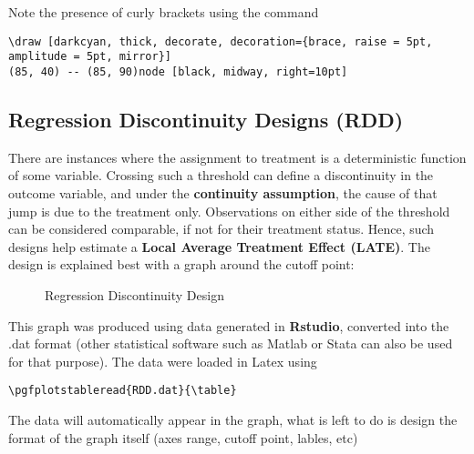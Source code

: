 \documentclass[english]{article}
\begin{document}
Note the presence of curly brackets using the command
\begin{lstlisting} 
\draw [darkcyan, thick, decorate, decoration={brace, raise = 5pt, amplitude = 5pt, mirror}]
(85, 40) -- (85, 90)node [black, midway, right=10pt]
\end{lstlisting} 

\subsection{Regression Discontinuity Designs (RDD)}	
There are instances where the assignment to treatment is a deterministic function of some variable. Crossing such a threshold can define a discontinuity in the outcome variable, and under the \textbf{continuity assumption}, the cause of that jump is due to the treatment only. Observations on either side of the threshold can be considered comparable, if not for their treatment status. Hence, such designs help estimate a \textbf{Local Average Treatment Effect (LATE)}. The design is explained best with a graph around the cutoff point:


\begin{figure}[H]
\begin{center}
\end{center}
\caption[RDD]{Regression Discontinuity Design}
\end{figure}

This graph was produced using data generated in \textbf{\textsf{Rstudio}}, converted into the .dat format (other statistical software such as Matlab or Stata can also be used for that purpose). The data were loaded in Latex using \begin{lstlisting} 
\pgfplotstableread{RDD.dat}{\table} 
\end{lstlisting} 
The data will automatically appear in the graph, what is left to do is design the format of the graph itself (axes range, cutoff point, lables, etc)
	
\end{document}
